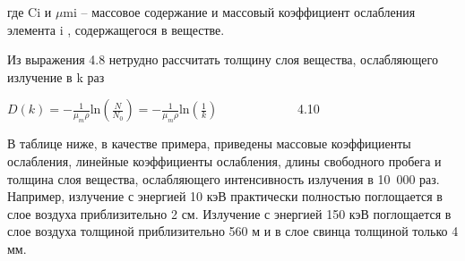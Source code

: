 \documentclass[a4paper,14pt, openany, twoside, draft]{extbook} %
\begin{document}
где Ci и ${\mu}$mi – массовое содержание и массовый коэффициент ослабления элемента i , содержащегося в веществе.

Из выражения 4.8 нетрудно рассчитать толщину слоя вещества, ослабляющего излучение в k раз

 $D(k)=-\frac 1{\mu _m\rho }\text{ln}(\frac N{N_0})=-\frac 1{\mu _m\rho }\text{ln}(\frac 1 k)$ \ \ \ \ \ \ \ \ \ \ \ \ 4.10

В таблице ниже, в качестве примера, приведены массовые коэффициенты ослабления, линейные коэффициенты ослабления, длины свободного пробега и толщина слоя вещества, ослабляющего интенсивность излучения в 10~000 раз.  Например, излучение с энергией 10 кэВ практически полностью поглощается в слое воздуха приблизительно 2 см. Излучение с энергией 150 кэВ поглощается в слое воздуха толщиной приблизительно 560 м и в слое свинца толщиной только 4 мм.
\end{document}
